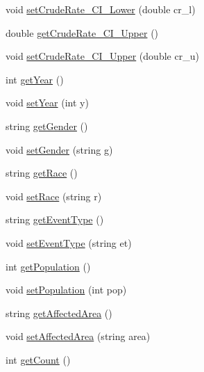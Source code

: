 \begin{DoxyCompactItemize}
\item 
void \mbox{\hyperlink{classbridges_1_1_cancer_incidence_a58cdb11fa6e8d2766d3ef98b1e8aea1f}{set\+Crude\+Rate\+\_\+\+C\+I\+\_\+\+Lower}} (double cr\+\_\+l)
\item 
double \mbox{\hyperlink{classbridges_1_1_cancer_incidence_aff936126f521c68e37c6de21f026a368}{get\+Crude\+Rate\+\_\+\+C\+I\+\_\+\+Upper}} ()
\item 
void \mbox{\hyperlink{classbridges_1_1_cancer_incidence_a40d654a767d9b20ffa6931591d96d42a}{set\+Crude\+Rate\+\_\+\+C\+I\+\_\+\+Upper}} (double cr\+\_\+u)
\item 
int \mbox{\hyperlink{classbridges_1_1_cancer_incidence_a47b950052e5487e3f6f5e346076927f9}{get\+Year}} ()
\item 
void \mbox{\hyperlink{classbridges_1_1_cancer_incidence_ac4c0d949ebb21dd890afe2714962fa5a}{set\+Year}} (int y)
\item 
string \mbox{\hyperlink{classbridges_1_1_cancer_incidence_ade0a0511bcac235d8b7f1fd17ec200a8}{get\+Gender}} ()
\item 
void \mbox{\hyperlink{classbridges_1_1_cancer_incidence_a994fbc9eb92c2d49b1b93a2eb904f2d8}{set\+Gender}} (string g)
\item 
string \mbox{\hyperlink{classbridges_1_1_cancer_incidence_a0be66745d8ceab243685eaeb2faf4178}{get\+Race}} ()
\item 
void \mbox{\hyperlink{classbridges_1_1_cancer_incidence_a9301e1c0bbf37aeccb74064aafd2d5e9}{set\+Race}} (string r)
\item 
string \mbox{\hyperlink{classbridges_1_1_cancer_incidence_aa44cf7891998043769fa42b100541ce4}{get\+Event\+Type}} ()
\item 
void \mbox{\hyperlink{classbridges_1_1_cancer_incidence_a5b8a7ac53de10c878f0571a7ee17f3a6}{set\+Event\+Type}} (string et)
\item 
int \mbox{\hyperlink{classbridges_1_1_cancer_incidence_afd5f1ebe1c73e25fd131f7800a70e8d7}{get\+Population}} ()
\item 
void \mbox{\hyperlink{classbridges_1_1_cancer_incidence_aaade0295abaeeabb23b9e03d5ffd364a}{set\+Population}} (int pop)
\item 
string \mbox{\hyperlink{classbridges_1_1_cancer_incidence_ae1e80b6cfc3a5f9471d21001878a1b8c}{get\+Affected\+Area}} ()
\item 
void \mbox{\hyperlink{classbridges_1_1_cancer_incidence_a9872d7a2e82ff0f7a676efe46d383d71}{set\+Affected\+Area}} (string area)
\item 
int \mbox{\hyperlink{classbridges_1_1_cancer_incidence_a70c20ca136a173bb920c525c78714c13}{get\+Count}} ()

\end{DoxyCompactItemize}
